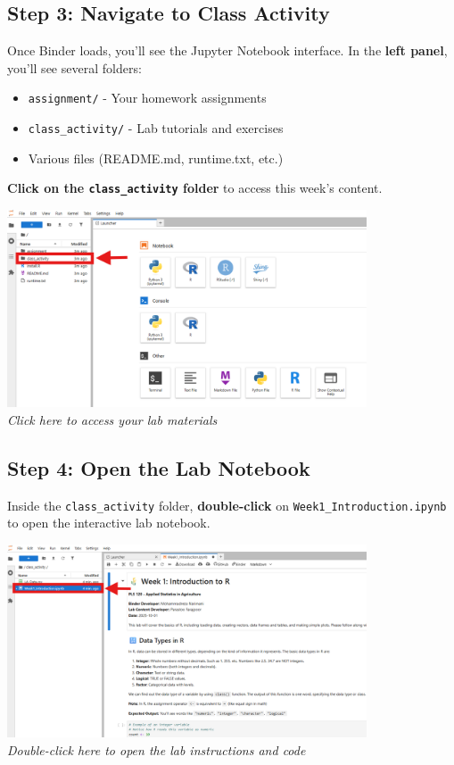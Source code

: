 \documentclass[11pt,a4paper]{article}
\begin{document}
\subsection{Step 3: Navigate to Class Activity}

Once Binder loads, you'll see the Jupyter Notebook interface. In the \textbf{left panel}, you'll see several folders:
\begin{itemize}
    \item \texttt{assignment/} - Your homework assignments
    \item \texttt{class\_activity/} - Lab tutorials and exercises
    \item Various files (README.md, runtime.txt, etc.)
\end{itemize}

\textbf{Click on the \texttt{class\_activity} folder} to access this week's content.

\begin{center}
\includegraphics[width=0.8\textwidth]{../Image_3.png}\\
\textit{Click here to access your lab materials}
\end{center}

\subsection{Step 4: Open the Lab Notebook}

Inside the \texttt{class\_activity} folder, \textbf{double-click} on \texttt{Week1\_Introduction.ipynb} to open the interactive lab notebook.

\begin{center}
\includegraphics[width=0.8\textwidth]{../Image_4.png}\\
\textit{Double-click here to open the lab instructions and code}
\end{center}
\end{document}
